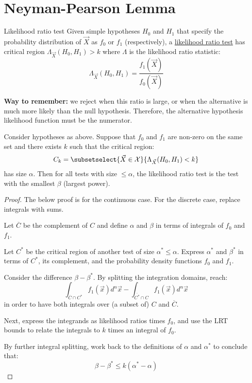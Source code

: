 \documentclass[../Main.tex]{subfiles}
\begin{document}
\section{Neyman-Pearson Lemma}
\begin{definition}{Likelihood ratio test}
    Given simple hypotheses $H_0$ and $H_1$ that specify the probability distribution of $\vec{X}$ as $f_0$ or $f_1$ (respectively), a \underline{likelihood ratio test} has critical region $\Lambda_{\vec{X}}(H_0, H_1) > k$ where $\Lambda$ is the likelihood ratio statistic:
    \begin{equation*}
        \Lambda_{\vec{X}}(H_0, H_1) = \frac{f_1(\vec{X})}{f_0(\vec{X})}
    \end{equation*}
\end{definition}
\textbf{Way to remember:} we reject when this ratio is large, or when the alternative is much more likely than the null hypothesis. Therefore, the alternative hypothesis likelihood function must be the numerator.
\begin{theorem}
    Consider hypotheses as above. Suppose that $f_0$ and $f_1$ are non-zero on the same set and there exists $k$ such that the critical region:
    \begin{equation*}
        C_k = \subsetselect{\vec{X} \in \samplespace}{\Lambda_{\vec{X}}(H_0, H_1) < k}
    \end{equation*}
    has size $\alpha$. Then for all tests with size $\leq \alpha$, the likelihood ratio test is the test with the smallest $\beta$ (largest power).
    \label{thmNeymanPearson}
\end{theorem}
\begin{proof}
    The below proof is for the continuous case. For the discrete case, replace integrals with sums.

    Let $\overline{C}$ be the complement of $C$ and define $\alpha$ and $\beta$ in terms of integrals of $f_0$ and $f_1$.

    Let $C^*$ be the critical region of another test of size $\alpha^* \leq \alpha$. Express $\alpha^*$ and $\beta^*$ in terms of $C^*$, its complement, and the probability density functions $f_0$ and $f_1$.

    Consider the difference $\beta - \beta^*$. By splitting the integration domains, reach:
    \begin{equation*}
        \int_{\overline{C} \cap C^*} f_1(\vec{x}) d^n\vec{x} - \int_{\overline{C^*}\cap C} f_1(\vec{x}) d^n \vec{x}
    \end{equation*}
    in order to have both integrals over (a subset of) $C$ and $\overline{C}$.

    Next, express the integrands as likelihood ratios times $f_0$, and use the LRT bounds to relate the integrals to $k$ times an integral of $f_0$.
    
    By further integral splitting, work back to the definitions of $\alpha$ and $\alpha^*$ to conclude that:
    \begin{equation*}
        \beta - \beta^* \leq k(\alpha^* - \alpha)
    \end{equation*}
\end{proof}
\end{document}
